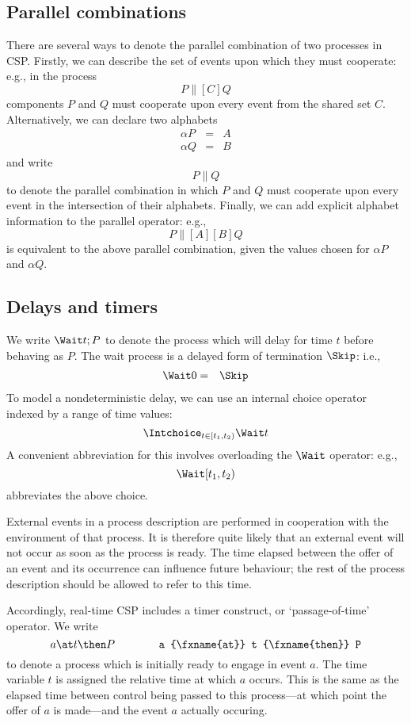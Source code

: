 \documentclass[12pt]{article}
\begin{document}
\subsection{Parallel combinations}

There are several ways to denote the parallel combination of
two processes in CSP.  Firstly, we can describe the set of events upon
which they must cooperate: e.g., in the process
\[
P \parallel[C] Q
\]
components $P$ and $Q$ must cooperate upon every event from the shared
set $C$.  Alternatively, we can declare two alphabets
\begin{eqnarray*}
\alpha P & = & A \\
\alpha Q & = & B
\end{eqnarray*}
and write
\[
P \parallel Q
\]
to denote the parallel combination in which $P$ and $Q$ must cooperate
upon every event in the intersection of their alphabets.  Finally, we
can add explicit alphabet information to the parallel operator: e.g.,
\[
P \parallel[A][B] Q
\]
is equivalent to the above parallel combination, given the values
chosen for $\alpha P$ and $\alpha Q$.

\subsection{Delays and timers}

We write $\Wait t ; P$ to denote the process which will delay for time
$t$ before behaving as $P$.  The wait process is a delayed form of
termination $\Skip$: i.e.,
\begin{eqnarray*}
\Wait 0 & = & \Skip
\end{eqnarray*}
To model a nondeterministic delay, we can use an internal choice
operator indexed by a range of time values:
\[
\Intchoice_{t \in [t_1,t_2)} \Wait t
\]
A convenient abbreviation for this involves overloading the $\Wait$
operator: e.g.,
\[
\Wait [t_1,t_2)
\]
abbreviates the above choice.

External events in a process description are performed in cooperation
with the environment of that process.  It is therefore quite likely
that an external event will not occur as soon as the process is ready.
The time elapsed between the offer of an event and its occurrence can
influence future behaviour; the rest of the process description should
be allowed to refer to this time.

Accordingly, real-time CSP includes a timer construct, or
`passage-of-time' operator.  We write
\[
a \at t \then P \qquad \qquad \hbox{\verb|a \at t \then P|}
\]
to denote a process which is initially ready to engage in event $a$.
The time variable $t$ is assigned the relative time at which $a$
occurs.  This is the same as the elapsed time between control being
passed to this process---at which point the offer of $a$ is made---and
the event $a$ actually occuring.
\end{document}
